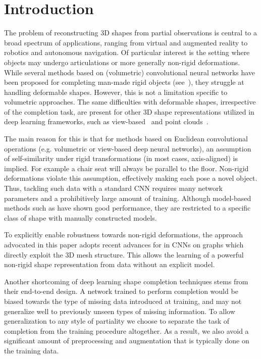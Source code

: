 \section{Introduction}
The problem of reconstructing 3D shapes from partial observations is central to a broad spectrum of applications, ranging from virtual and augmented reality to robotics and autonomous navigation. Of particular interest is the setting where objects may undergo articulations or more generally non-rigid deformations. While several methods based on (volumetric) convolutional neural networks have been proposed for completing man-made rigid objects (see~\cite{dai2016shape,song2016semantic,varley17iros,wu20153d,sharma16eccvw}), they struggle at handling deformable shapes. However, this is not a limitation specific to volumetric approaches. The same difficulties with deformable shapes, irrespective of the completion task, are present for other 3D shape representations utilized in deep learning frameworks, such as view-based~\cite{su2015multi,wei2016dense} and point clouds~\cite{qi2016pointnet,qi2017pointnet++}.

The main reason for this is that for methods based on Euclidean convolutional operations (e.g. volumetric or view-based deep neural networks), an assumption of self-similarity under rigid transformations (in most cases, axis-aligned) is implied. For example a chair seat will always be parallel to the floor. Non-rigid deformations violate this assumption, effectively making each pose a novel object. Thus, tackling such data with a standard CNN requires many network parameters and a prohibitively large amount of training. Although model-based methods such as \cite{anguelov2005scape} have shown good performance, they are restricted to a specific class of shape with manually constructed models. 

To explicitly enable robustness towards non-rigid deformations, the approach advocated in this paper adopts recent advances for in CNNs on graphs which directly exploit the 3D mesh structure. This allows the learning of a powerful non-rigid shape representation from data without an explicit model.

Another shortcoming of deep learning shape completion techniques stems from their end-to-end design. A network trained to perform completion would be biased towards the type of missing data introduced at training, and may not generalize well to previously unseen types of missing information. To allow generalization to any style of partiality we choose to separate the task of completion from the training procedure altogether. As a result, we also avoid a significant amount of preprocessing and augmentation that is typically done on the training data.

